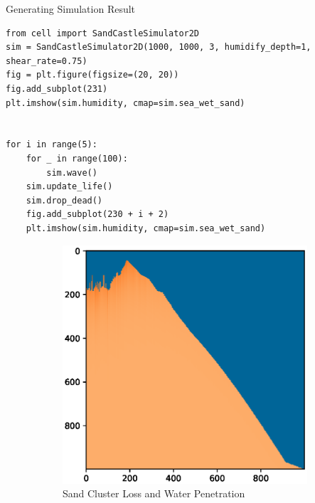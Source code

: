 \documentclass[12pt]{article}
\begin{document}
\begin{longlisting}
    \caption{Generating Simulation Result}
    \begin{verbatim}
from cell import SandCastleSimulator2D
sim = SandCastleSimulator2D(1000, 1000, 3, humidify_depth=1, shear_rate=0.75)
fig = plt.figure(figsize=(20, 20))
fig.add_subplot(231)
plt.imshow(sim.humidity, cmap=sim.sea_wet_sand)


for i in range(5):
    for _ in range(100):
        sim.wave()
    sim.update_life()
    sim.drop_dead()
    fig.add_subplot(230 + i + 2)
    plt.imshow(sim.humidity, cmap=sim.sea_wet_sand)    \end{verbatim}
\end{longlisting}
\begin{figure}[H]
    \centering
    \begin{subfigure}[a]{\linewidth}
        \includegraphics[width=\linewidth]{Figure_1.eps}
        \caption{Sand Cluster Loss and Water Penetration}
    \end{subfigure}
    \begin{subfigure}[c]{0.7\linewidth}

\end{subfigure}
\end{figure}
\end{document}
